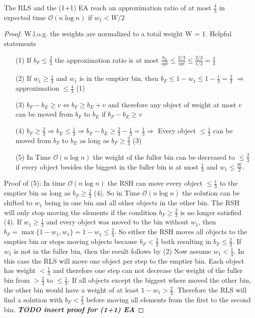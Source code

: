 \begin{lemma}\label{approximationLemma}
    The RLS and the (1+1) EA reach an approximation ratio of at most $\frac{4}{3}$ in expected time $\mathcal{O}(n\log{}n)$ if $w_1 < W/2$
\end{lemma}
\begin{proof}
    W.l.o.g. the weights are normalized to a total weight W = 1.
    \newline Helpful statements
    \begin{itemize}
        \item[(1)]\label{helpPoint1} If \(b_F \le \frac{2}{3}\) the approximation ratio is at most \(\frac{b_F}{opt} \le \frac{2/3}{opt} \le \frac{2/3}{1/2} = \frac{4}{3}\)
        \item[(2)]\label{helpPoint2} If \(w_1 \ge \frac{1}{3}\) and \(w_1\) is in the emptier bin, then \( b_F \le 1 - w_1 \le 1 - \frac{1}{3} = \frac{2}{3} \) \newline $\Rightarrow$ approximation \(\le \frac{4}{3}\) (1)
        \item[(3)]\label{helpPoint3} \(b_F - b_E \ge v \Leftrightarrow b_F \ge b_E + v\) and therefore any object of weight at most $v$ can be moved from $b_F$ to $b_E$ if \(b_F - b_E \ge v\)
        \item[(4)]\label{helpPoint4} \(b_F \ge \frac{2}{3} \Rightarrow b_E \le \frac{1}{3} \Rightarrow b_F - b_E \ge \frac{2}{3} - \frac{1}{3} = \frac{1}{3} \Rightarrow\) Every object \(\le \frac{1}{3}\) can be moved from $b_F$ to $b_E$ as long as \(b_F \ge \frac{2}{3}\) (3)
        \item[(5)]\label{helpPoint5} In Time $\mathcal{O}(n\log{}n)$ the weight of the fuller bin can be decreased to \(\le \frac{2}{3}\) if every object besides the biggest in the fuller bin is at most $\frac{1}{3}$ and \(w_1 \le \frac{W}{2}\).
    \end{itemize}
    Proof of (5): \newline
    In time $\mathcal{O}(n\log{}n)$ the RSH can move every object $\le \frac{1}{3}$ to the emptier bin as long as $b_F \ge \frac{2}{3}$ (4). So in Time $\mathcal{O}(n\log{}n)$ the solution can be shifted to $w_1$ being in one bin and all other objects in the other bin. The RSH will only stop moving the elements if the condition $b_F \ge \frac{2}{3}$ is no longer satisfied (4). If \(w_1 \ge \frac{1}{3}\) and every object was moved to the bin without $w_1$, then \(b_F = \max\{1-w_1, w_1\} = 1-w_1 \le \frac{2}{3}\). So either the RSH moves all objects to the emptier bin or stops moving objects because $b_F < \frac{2}{3}$ both resulting in $b_F \le \frac{2}{3}$. If $w_1$ is not in the fuller bin, then the result follows by (2)\newline
    Now assume \(w_1 < \frac{1}{3}\). In this case the RLS will move one object per step to the emptier bin. Each object has weight $< \frac{1}{3}$ and therefore one step can not decrease the weight of the fuller bin from $> \frac{2}{3}$ to $\le \frac{1}{3}$. If all objects except the biggest where moved the other bin, the other bin would have a weight of at least \(1-w_1 > \frac{2}{3}\). Therefore the RLS will find a solution with $b_F < \frac{2}{3}$ before moving all elements from the first to the second bin. \textbf{\textit{TODO insert proof for (1+1) EA}}



\end{proof}
